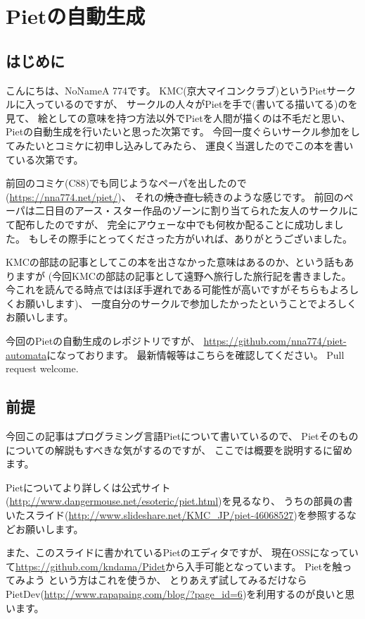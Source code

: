 \chapter[Pietの自動生成]{Pietの自動生成}

\section{はじめに}

こんにちは、NoNameA 774です。
KMC(京大マイコンクラブ)というPietサークルに入っているのですが、
サークルの人々がPietを手で(書いてる\textbar{}描いてる)のを見て、
絵としての意味を持つ方法以外でPietを人間が描くのは不毛だと思い、
Pietの自動生成を行いたいと思った次第です。
今回一度ぐらいサークル参加をしてみたいとコミケに初申し込みしてみたら、
運良く当選したのでこの本を書いている次第です。

前回のコミケ(C88)でも同じようなペーパを出したので(\url{https://nna774.net/piet/})、
それの\sout{焼き直し}続きのような感じです。
前回のペーパは二日目のアース・スター作品のゾーンに割り当てられた友人のサークルにて配布したのですが、
完全にアウェーな中でも何枚か配ることに成功しました。
もしその際手にとってくださった方がいれば、ありがとうございました。

KMCの部誌の記事としてこの本を出さなかった意味はあるのか、という話もありますが
(今回KMCの部誌の記事として遠野へ旅行した旅行記を書きました。
今これを読んでる時点ではほぼ手遅れである可能性が高いですがそちらもよろしくお願いします)、
一度自分のサークルで参加したかったということでよろしくお願いします。

今回のPietの自動生成のレポジトリですが、
\url{https://github.com/nna774/piet-automata}になっております。
最新情報等はこちらを確認してください。
Pull request welcome.

\section{前提}

今回この記事はプログラミング言語Pietについて書いているので、
Pietそのものについての解説もすべきな気がするのですが、
ここでは概要を説明するに留めます。

Pietについてより詳しくは公式サイト(\url{http://www.dangermouse.net/esoteric/piet.html})を見るなり、
うちの部員の書いたスライド(\url{http://www.slideshare.net/KMC\_JP/piet-46068527})を参照するなどお願いします。

また、このスライドに書かれているPietのエディタですが、
現在OSSになっていて\url{https://github.com/kndama/Pidet}から入手可能となっています。
Pietを触ってみよう という方はこれを使うか、
とりあえず試してみるだけならPietDev(\url{http://www.rapapaing.com/blog/?page\_id=6})を利用するのが良いと思います。

